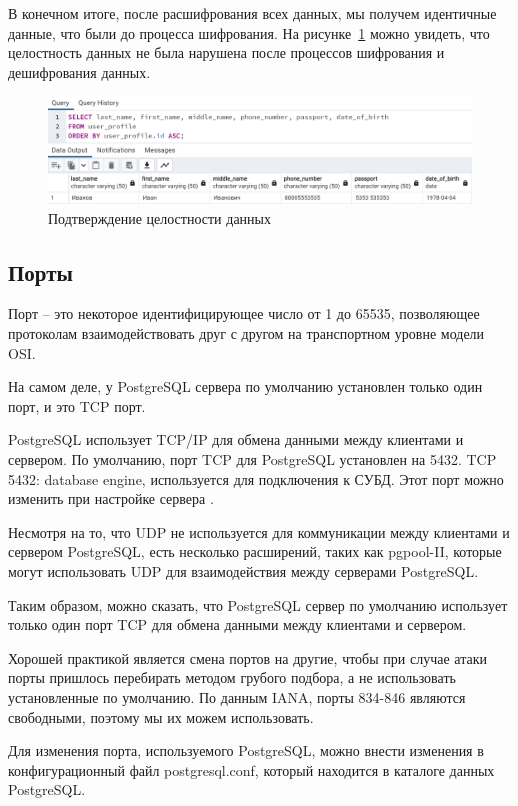 В конечном итоге, после расшифрования всех данных, мы получем идентичные данные, что были до процесса шифрования. На рисунке~\ref{fig:fig20} можно увидеть, что целостность данных не была нарушена после процессов шифрования и дешифрования данных.

\begin{figure}
  \includegraphics[scale=0.456]{inc/table_user_profile}
  \caption{Подтверждение целостности данных}
  \label{fig:fig20}
\end{figure}



\subsection{Порты}

Порт – это некоторое идентифицирующее число от 1 до 65535, позволяющее протоколам взаимодействовать друг с другом на транспортном уровне модели OSI.

На самом деле, у PostgreSQL сервера по умолчанию установлен только один порт, и это TCP порт.

PostgreSQL использует TCP/IP для обмена данными между клиентами и сервером. По умолчанию, порт TCP для PostgreSQL установлен на 5432. TCP 5432: database engine, используется для подключения к СУБД. Этот порт можно изменить при настройке сервера \cite{online7}.

Несмотря на то, что UDP не используется для коммуникации между клиентами и сервером PostgreSQL, есть несколько расширений, таких как pgpool-II, которые могут использовать UDP для взаимодействия между серверами PostgreSQL.

Таким образом, можно сказать, что PostgreSQL сервер по умолчанию использует только один порт TCP для обмена данными между клиентами и сервером.

Хорошей практикой является смена портов на другие, чтобы при случае атаки порты пришлось перебирать методом грубого подбора, а не использовать установленные по умолчанию. По данным IANA, порты 834-846 являются свободными, поэтому мы их можем использовать.

Для изменения порта, используемого PostgreSQL, можно внести изменения в конфигурационный файл postgresql.conf, который находится в каталоге данных PostgreSQL.

